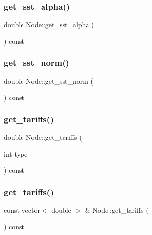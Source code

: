 \subsubsection{\texorpdfstring{get\_sst\_alpha()}{get\_sst\_alpha()}}
{\footnotesize\ttfamily double Node\+::get\+\_\+sst\+\_\+alpha (\begin{DoxyParamCaption}{ }\end{DoxyParamCaption}) const}

\mbox{\label{class_node_a7df6409a6fefb332e651d8eac9e6ee0f}} 
\subsubsection{\texorpdfstring{get\_sst\_norm()}{get\_sst\_norm()}}
{\footnotesize\ttfamily double Node\+::get\+\_\+sst\+\_\+norm (\begin{DoxyParamCaption}{ }\end{DoxyParamCaption}) const}

\mbox{\label{class_node_a23a254d7bf21e9dfab6bcf585b27b14a}} 
\subsubsection{\texorpdfstring{get\_tariffs()}{get\_tariffs()}\hspace{0.1cm}{\footnotesize\ttfamily [1/2]}}
{\footnotesize\ttfamily double Node\+::get\+\_\+tariffs (\begin{DoxyParamCaption}\item[{int}]{type }\end{DoxyParamCaption}) const}

\mbox{\label{class_node_abe2fdaaa568757a91562e6266a7feae0}} 
\subsubsection{\texorpdfstring{get\_tariffs()}{get\_tariffs()}\hspace{0.1cm}{\footnotesize\ttfamily [2/2]}}
{\footnotesize\ttfamily const vector$<$ double $>$ \& Node\+::get\+\_\+tariffs (\begin{DoxyParamCaption}{ }\end{DoxyParamCaption}) const}

